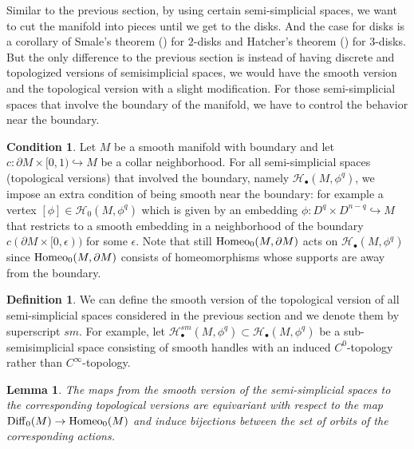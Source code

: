 \documentclass[a4paper]{amsart}
\newtheorem{lem}[thm]{Lemma}
\theoremstyle{definition}
\newtheorem{defn}[thm]{Definition}
\newtheorem*{cond}{Condition}
\theoremstyle{remark}
\newcommand\Diff{\mathrm{Diff}}
\newcommand{\tH}{\text{\textnormal{Homeo}}}
\numberwithin{equation}{section}
\begin{document}
Similar to the previous section, by using certain semi-simplicial spaces, we want to cut the manifold into pieces until we get to the disks. And the case for disks is a corollary of Smale's theorem (\cite{MR0112149}) for $2$-disks and Hatcher's theorem (\cite{hatcher1983proof}) for $3$-disks. But  the only difference to the previous section is instead of having  discrete and topologized versions of semisimplicial spaces, we would have the smooth version and the topological version with a slight modification. For those semi-simplicial spaces that involve the boundary of the manifold, we have to control the behavior near the boundary.  
\begin{cond}Let $M$ be a smooth manifold with boundary and let $c:\partial M\times [0,1)\hookrightarrow M$ be a collar neighborhood. For all semi-simplicial spaces (topological versions) that involved the boundary, namely  $\mathcal{H}_{\bullet}(M,\phi^q)$, we impose an extra condition of being smooth near the boundary:  for example a vertex $[\phi]\in \mathcal{H}_{0}(M,\phi^q)$ which is given by an embedding $\phi: D^q\times D^{n-q}\hookrightarrow M$ that restricts to a smooth embedding in a neighborhood of the boundary $c(\partial M\times [0,\epsilon) )$ for some $\epsilon$. Note that still  $\tH_0(M,\partial M)$ acts on $\mathcal{H}_{\bullet}(M,\phi^q)$ since $\tH_0(M,\partial M)$ consists of  homeomorphisms whose supports are away from the boundary. 
\end{cond}
\begin{defn}
We can define the smooth version of the topological version of all semi-simplicial spaces considered in the previous section and we denote them by superscript $sm$. For example, let $\mathcal{H}_{\bullet}^{sm}(M,\phi^q)\subset \mathcal{H}_{\bullet}(M,\phi^q)$ be a sub-semisimplicial space consisting of smooth handles with an induced $C^0$-topology rather than $C^{\infty}$-topology. 
\end{defn}
\begin{lem}
 The maps from the smooth version of the semi-simplicial spaces to the corresponding topological versions are equivariant with respect to the map $\Diff_0(M)\to \tH_0(M)$ and induce  bijections between the set of orbits of the corresponding actions.
\end{lem}
\end{document}
